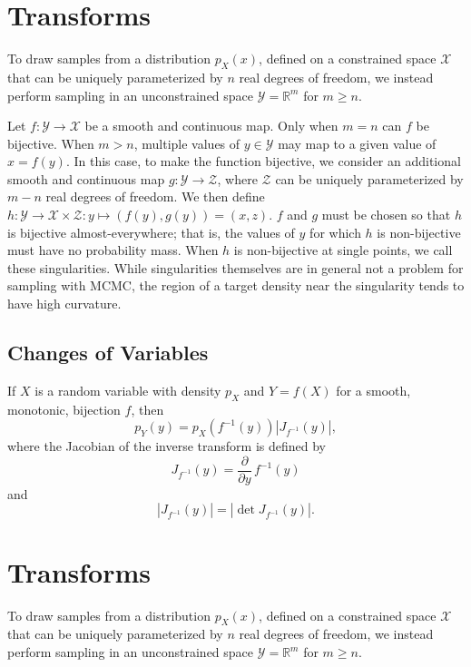 \documentclass[11pt]{article}
\newcommand{\abs}[1]{\left| #1 \right|}
\newcommand{\absdet}[1]{\abs{#1}}
\begin{document}
\section{Transforms}

To draw samples from a distribution $p_X(x)$, defined on a constrained space $\mathcal{X}$ that can be uniquely parameterized by $n$ real degrees of freedom, we instead perform sampling in an unconstrained space $\mathcal{Y}=\mathbb{R}^m$ for $m \ge n$.

Let $f\colon \mathcal{Y} \to \mathcal{X}$ be a smooth and continuous map.
Only when $m = n$ can $f$ be bijective.
When $m > n$, multiple values of $y \in \mathcal{Y}$ may map to a given value of $x = f(y)$.
In this case, to make the function bijective, we consider an additional smooth and continuous map $g\colon \mathcal{Y} \to \mathcal{Z}$, where $\mathcal{Z}$ can be uniquely parameterized by $m - n$ real degrees of freedom.
We then define $h\colon \mathcal{Y} \to \mathcal{X} \times \mathcal{Z}: y \mapsto (f(y), g(y)) = (x, z)$.
$f$ and $g$ must be chosen so that $h$ is bijective almost-everywhere;
that is, the values of $y$ for which $h$ is non-bijective must have no probability mass.
When $h$ is non-bijective at single points, we call these singularities.
While singularities themselves are in general not a problem for sampling with MCMC, the region of a target density near the singularity tends to have high curvature.

\subsection{Changes of Variables}

If $X$ is a random variable with density $p_X$ and $Y = f(X)$ for a
smooth, monotonic, bijection $f$, then
\[
  p_Y(y) = p_X(f^{-1}(y)) \absdet{J_{f^{-1}}(y)},
\]
where the Jacobian of the inverse transform is defined by
\[
  J_{f^{-1}}(y) = \frac{\partial}{\partial y} \, f^{-1}(y)
\]
and
\[
  \absdet{J_{f^{-1}}(y)}
  = \abs{\det J_{f^{-1}}(y)}.
\]

\section{Transforms}

To draw samples from a distribution $p_X(x)$, defined on a constrained space $\mathcal{X}$ that can be uniquely parameterized by $n$ real degrees of freedom, we instead perform sampling in an unconstrained space $\mathcal{Y}=\mathbb{R}^m$ for $m \ge n$.
\end{document}
